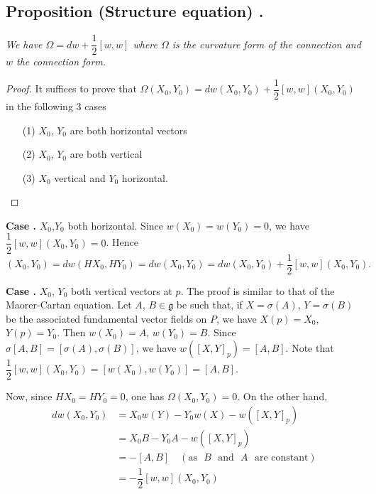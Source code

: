 \subsection*{Proposition (Structure equation) .\label{sec12-prop12.3}}

{\em We have $\Omega=dw+\dfrac{1}{2}[w,w]$ where $\Omega$ is the curvature form of the connection and $w$ the connection form.}

\begin{proof}
It suffices to prove that $\Omega(X_{0},Y_{0})=dw(X_{0},Y_{0})+\dfrac{1}{2}[w,w](X_{0},Y_{0})$ in the following $3$ cases 
\begin{itemize}
\item[(1)] $X_{0}$, $Y_{0}$ are both horizontal vectors

\item[(2)] $X_{0}$, $Y_{0}$ are both vertical

\item[(3)] $X_{0}$ vertical and $Y_{0}$ horizontal.
\end{itemize}
\end{proof}

\noindent
{\bf Case .\label{sec12-case1}} $X_{0}$,\pageoriginale $Y_{0}$ both horizontal. Since $w(X_{0})=w(Y_{0})=0$, we have $\dfrac{1}{2}[w,w](X_{0},Y_{0})=0$. Hence
$$
(X_{0},Y_{0})=dw(HX_{0},HY_{0})=dw(X_{0},Y_{0})=dw(X_{0},Y_{0})+\dfrac{1}{2}[w,w](X_{0},Y_{0}).
$$

\noindent
{\bf Case .\label{sec12-case2}}
$X_{0}$, $Y_{0}$ both vertical vectors at $p$. The proof is similar to that of the Maorer-Cartan equation. Let $A$, $B\in \mathfrak{g}$ be such that, if $X=\sigma(A)$, $Y=\sigma(B)$ be the associated fundamental vector fields on $P$, we have $X(p)=X_{0}$, $Y(p)=Y_{0}$. Then $w(X_{0})=A$, $w(Y_{0})=B$. Since $\sigma[A,B]=[\sigma(A),\sigma(B)]$, we have $w([X,Y]_{p})=[A,B]$. Note that $\dfrac{1}{2}[w,w](X_{0},Y_{0})=[w(X_{0}),w(Y_{0})]=[A,B]$.

\smallskip
Now, since $HX_{0}=HY_{0}=0$, one has $\Omega(X_{0},Y_{0})=0$. On the other hand,
\begin{align*}
dw(X_{0},Y_{0}) &= X_{0}w(Y)-Y_{0}w(X)-w([X,Y]_{p})\\[3pt]
              &= X_{0}B-Y_{0}A-w([X,Y]_{p})\\[3pt]
              &= -[A,B]\quad(\text{as~ } B\text{~ and~ } A\text{~ are constant})\\[3pt]
              &= -\dfrac{1}{2}[w,w](X_{0},Y_{0})
\end{align*}

